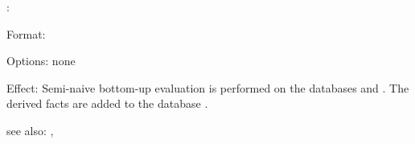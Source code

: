 :

Format: 

Options: none

Effect: Semi-naive bottom-up evaluation is performed on the databases 
	 and .  The derived facts are added to the 
	database .

see also: , 

